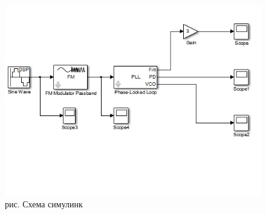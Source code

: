 \documentclass[10pt,a4paper]{report}
\begin{document}
\begin{figure}
\begin{center}
\includegraphics[width=150mm, scale = 0.9]{8_13}\newline
рис. Схема симулинк\newline
\end{center}
\end{figure}

\clearpage
\end{document}
